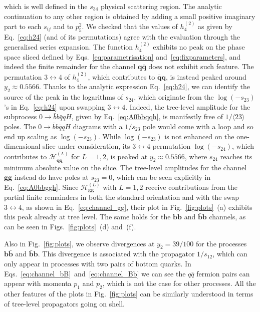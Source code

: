 \documentclass[main.tex]{subfiles}
\begin{document}
which is well defined in the $s_{34}$ physical scattering region. The analytic continuation to any other region is obtained by adding a small positive imaginary part to each $s_{ij}$ and to $p_5^2$. We checked that the values of $h^{(2)}_4$ as given by Eq.~\ref{eq:h24} (and of its permutations) agree with the evaluation through the generalised series expansion. The function $h^{(2)}_4$ exhibits no peak on the phase space sliced defined by Eqs.~\ref{eq:parametrisation} and~\ref{eq:fixparameters}, and indeed the finite remainder for the channel $\mathbf{q\bar{q}}$ does not exhibit such feature. The permutation $3\leftrightarrow 4$ of $h^{(2)}_4$, which contributes to $\mathbf{\bar{q}q}$, is instead peaked around $y_2 \approx 0.5566$. Thanks to the analytic expression Eq.~\ref{eq:h24}, we can identify the source of the peak in the logarithms of $s_{24}$, which originate from the $\log (-s_{23})$'s in Eq.~\ref{eq:h24} upon swapping $3\leftrightarrow 4$. Indeed, the tree-level amplitude for the subprocess $0\to\bar{b} b \bar{q} q H$, given by Eq.~\ref{eq:A0bbqqh}, is manifestly free of $1/\langle 23 \rangle$ poles. The $0\to\bar{b} b \bar{q} q H$ diagrams with a $1/s_{23}$ pole would come with a loop and so end up scaling as $\log(-s_{23})$. While $\log(-s_{23})$ is not enhanced on the one-dimensional slice under consideration, its $3\leftrightarrow4$ permutation $\log(-s_{24})$, which contributes to $\mathcal{H}^{(L)}_{\mathbf{\bar{q}q}}$ for $L=1,2$, is peaked at $y_2 \approx 0.5566$, where $s_{24}$ reaches its minimum absolute value on the slice. 
The tree-level amplitudes for the channel $\mathbf{gg}$ instead do have poles at $s_{23}=0$, which
can be seen explicitly in Eq.~\ref{eq:A0bbggh}. Since $\mathcal{H}^{(L)}_{\mathbf{gg}}$ with
$L=1,2$ receive contributions from the partial finite remainders in both the standard orientation
and with the swap $3\leftrightarrow4$, as shown in Eq.~\ref{eq:channel_gg}, their plot in Fig.~\ref{fig:plots}~(a) exhibits this peak already at tree level. The same holds for the $\mathbf{bb}$ and $\mathbf{\bar{b}b}$ channels, as can be seen in Figs.~\ref{fig:plots}~(d) and~(f). 

Also in Fig.~\ref{fig:plots}, we observe divergences at $y_2 = 39/100$ for the processes
$\mathbf{b\bar{b}}$ and $\mathbf{\bar{b}b}$. This divergence is associated with the propagator
$1/s_{12}$, which can only appear in processes with two pairs of bottom quarks. In Eqs.~\ref{eq:channel_bB}~and~\ref{eq:channel_Bb} 
we can see the $q\bar{q}$ fermion pairs can appear
with momenta $p_1$ and $p_2$, which is not the case for other processes. All the other features of the plots
in Fig.~\ref{fig:plots} can be similarly understood in terms of tree-level propagators going on shell.
\end{document}
